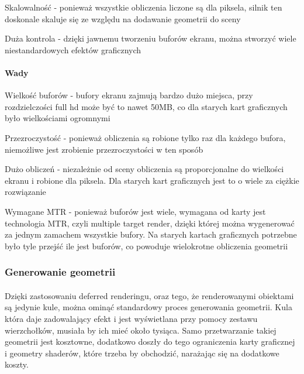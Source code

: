 \begin{description}
\item{Skalowalność} - ponieważ wszystkie obliczenia liczone są dla piksela, silnik ten doskonale skaluje się ze względu na dodawanie geometrii do sceny
\item{Duża kontrola} - dzięki jawnemu tworzeniu buforów ekranu, można stworzyć wiele niestandardowych efektów graficznych
\end{description}

\paragraph{Wady}

\begin{description}
\item{Wielkość buforów} - bufory ekranu zajmują bardzo dużo miejsca, przy rozdzielczości full hd może być to nawet 50MB, co dla starych kart graficznych było wielkościami ogromnymi
\item{Przezroczystość} - ponieważ obliczenia są robione tylko raz dla każdego bufora, niemożliwe jest zrobienie przezroczystości w ten sposób
\item{Dużo obliczeń} - niezależnie od sceny obliczenia są proporcjonalne do wielkości ekranu i robione dla piksela. Dla starych kart graficznych jest to o wiele za ciężkie rozwiązanie
\item{Wymagane MTR} - ponieważ buforów jest wiele, wymagana od karty jest technologia MTR, czyli multiple target render, dzięki której można wygenerować za jednym zamachem wszystkie bufory. Na starych kartach graficznych potrzebne było tyle przejść ile jest buforów, co powoduje wielokrotne obliczenia geometrii
\end{description}

\subsubsection{Generowanie geometrii}\label{ssub:generowanie geometrii}
\paragraph{}

Dzięki zastosowaniu deferred renderingu, oraz tego, że renderowanymi obiektami są jedynie kule, można ominąć standardowy proces generowania geometrii. Kula która daje zadowalający efekt i jest wyświetlana przy pomocy zestawu wierzchołków, musiała by ich mieć około tysiąca. Samo przetwarzanie takiej geometrii jest kosztowne, dodatkowo doszły do tego ograniczenia karty graficznej i geometry shaderów, które trzeba by obchodzić, narażając się na dodatkowe koszty.

